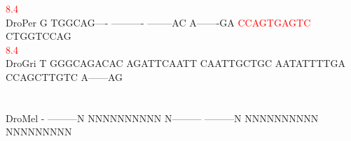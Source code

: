 \documentclass[11pt,twoside,reqno,a4paper]{article}
\begin{document}
{\hspace*{7\charwidth}\hspace*{1\charwidth}\hspace*{1\charwidth}\hspace*{1\charwidth}\hspace*{1\charwidth}\hspace*{1\charwidth}\hspace*{41\charwidth}\textcolor{Red}{8.4}\hspace*{1\charwidth}\\
DroPer	G	TGGCAG----	----------	--------AC	A-------GA	\textcolor{Red}{C}\textcolor{Red}{C}\textcolor{Red}{A}\textcolor{Red}{G}\textcolor{Red}{T}\textcolor{Red}{G}\textcolor{Red}{A}\textcolor{Red}{G}\textcolor{Red}{T}\textcolor{Red}{C}	CTGGTCCAG\\
\hspace*{7\charwidth}\hspace*{1\charwidth}\hspace*{1\charwidth}\hspace*{1\charwidth}\hspace*{1\charwidth}\hspace*{1\charwidth}\hspace*{41\charwidth}\textcolor{Red}{8.4}\hspace*{1\charwidth}\\
DroGri	T	GGGCAGACAC	AGATTCAATT	CAATTGCTGC	AATATTTTGA	CCAGCTTGTC	A------AG\\
\hspace*{7\charwidth}\hspace*{1\charwidth}\hspace*{1\charwidth}\hspace*{1\charwidth}\hspace*{1\charwidth}\hspace*{1\charwidth}\hspace*{1\charwidth}\\
\\
DroMel	-	---------N	NNNNNNNNNN	N---------	---------N	NNNNNNNNNN	NNNNNNNNN\\
\hspace*{7\charwidth}\hspace*{1\charwidth}\hspace*{1\charwidth}\hspace*{1\charwidth}\hspace*{1\charwidth}\hspace*{1\charwidth}\hspace*{1\charwidth}\\
}
\end{document}
